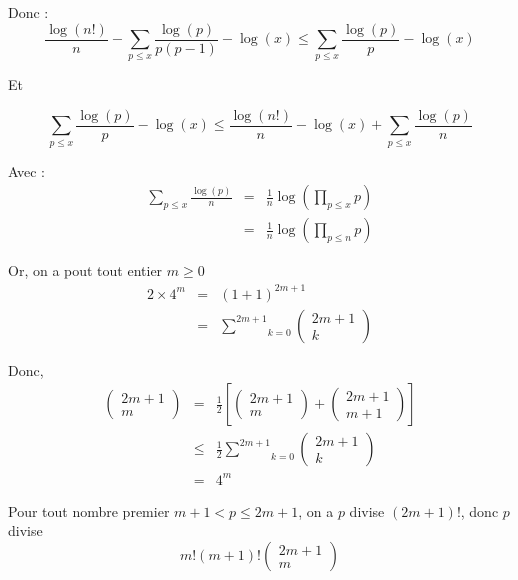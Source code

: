 Donc :
\[ \frac{\log (n!)}{n} - \underset{p \leqslant x}{\sum} \frac{\log (p)}{p (p -
   1)} - \log (x) \leqslant \underset{p \leqslant x}{\sum} \frac{\log (p)}{p}
   - \log (x) \]


Et


\[ \underset{p \leqslant x}{\sum} \frac{\log (p)}{p} - \log (x) \leqslant
   \frac{\log (n!)}{n} - \log (x) + \underset{p \leqslant x}{\sum} \frac{\log
   (p)}{n} \]


Avec :
\begin{eqnarray*}
  \underset{p \leqslant x}{\sum} \frac{\log (p)}{n} & = & \frac{1}{n} \log
  \left( \underset{p \leqslant x}{\prod} p \right)\\
  & = & \frac{1}{n} \log \left( \underset{p \leqslant n}{\prod} p \right)
\end{eqnarray*}


Or, on a pout tout entier $m \geqslant 0$
\begin{eqnarray*}
  2 \times 4^m & = & (1 + 1)^{2 m + 1}\\
  & = & \underset{k = 0}{\overset{2 m + 1}{\sum}} \left( \begin{array}{c}
    2 m + 1\\
    k
  \end{array} \right)
\end{eqnarray*}


Donc,
\begin{eqnarray*}
  \left( \begin{array}{c}
    2 m + 1\\
    m
  \end{array} \right) & = & \frac{1}{2} \left[ \left( \begin{array}{c}
    2 m + 1\\
    m
  \end{array} \right) + \left( \begin{array}{c}
    2 m + 1\\
    m + 1
  \end{array} \right) \right]\\
  & \leqslant & \frac{1}{2} \underset{k = 0}{\overset{2 m + 1}{\sum}} \left(
  \begin{array}{c}
    2 m + 1\\
    k
  \end{array} \right)\\
  & = & 4^m
\end{eqnarray*}


Pour tout nombre premier $m + 1 < p \leqslant 2 m + 1$, on a $p$ divise $(2 m
+ 1) !$, donc $p$ divise
\[ m! (m + 1) ! \left( \begin{array}{c}
     2 m + 1\\
     m
   \end{array} \right) \]


